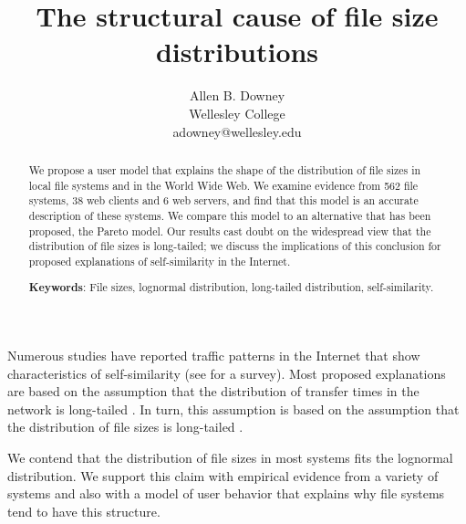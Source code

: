 \documentclass[10pt,twocolumn]{article}
\begin{document}
\title{The structural cause of file size distributions}

\author{Allen B. Downey\\
Wellesley College\\
adowney@wellesley.edu}

\date{}

\maketitle


\pagestyle{plain}
\thispagestyle{myheadings}

\begin{abstract}

We propose a user model that explains the shape of the distribution of
file sizes in local file systems and in the World Wide Web.  We
examine evidence from 562 file systems, 38 web clients and 6 web
servers, and find that this model is an accurate description of these
systems.  We compare this model to an alternative that has been
proposed, the Pareto model.  Our results cast doubt on the widespread
view that the distribution of file sizes is long-tailed; we discuss
the implications of this conclusion for proposed explanations of
self-similarity in the Internet.

\vspace{0.1in}\noindent
\textbf{Keywords}: File sizes, lognormal
distribution, long-tailed distribution, self-similarity.

\end{abstract}

\label {intro}

Numerous studies have reported traffic patterns in the Internet that
show characteristics of self-similarity (see \cite{ParkWillinger00}
for a survey).  Most proposed explanations are
based on the assumption that the distribution of transfer times in the
network is long-tailed \cite{PaxsonFloyd95} \cite{ParulekarMakowski96}
\cite{WillingerTaqquShermanWilson95}
\cite{FeldmannGilbertHuangWillinger99}.  In turn, this assumption is
based on the assumption that the distribution of file sizes is
long-tailed \cite{ParkKimCrovella96} \cite{CrovellaTaqquBestavros99}.

We contend that the distribution of file sizes in most
systems fits the lognormal distribution.  We support
this claim with empirical evidence from a variety of systems and also
with a model of user behavior that explains why file systems tend to
have this structure.
\end{document}
